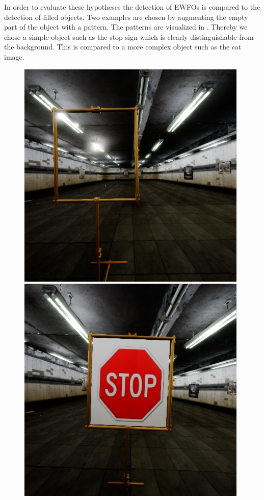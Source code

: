 In order to evaluate these hypotheses the detection of \acp{EWFO} is compared to the detection of filled objects. Two examples are chosen by augmenting the empty part of the object with a pattern. The patterns are visualized in . Thereby we chose a simple object such as the stop sign which is clearly distinguishable from the background. This is compared to a more complex object such as the cat image.

\begin{figure}[hbtp]
	\centering
	\begin{minipage}{0.3\textwidth}
		\includegraphics[width=\textwidth]{fig/gate}
	\end{minipage}
	\begin{minipage}{0.3\textwidth}
		\includegraphics[width=\textwidth]{fig/sign}

\end{minipage}
\end{figure}
